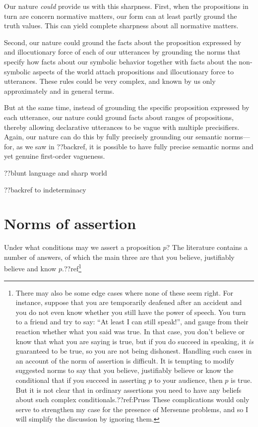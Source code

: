 Our nature \textit{could} provide us with this sharpness. First, when the propositions in turn are concern normative matters, our 
form can at least partly ground the truth values. This can yield complete sharpness about all normative matters.

Second, our nature could ground the facts about the proposition expressed by and illocutionary force of each of our utterances 
by grounding the norms that specify how facts about our symbolic behavior together with facts about the non-symbolic aspects of the world attach 
propositions and illocutionary force to utterances. These rules could be very complex, and known by us only approximately and in general
terms. 

But at the same time, instead of grounding the specific proposition expressed by each utterance, our nature could ground facts 
about ranges of propositions, thereby allowing declarative utterances to be vague with multiple precisifiers. Again, our nature 
can do this by fully precisely grounding our semantic norms---for, as we saw in ??backref, it is possible to have fully precise
semantic norms and yet genuine first-order vagueness.

??blunt language and sharp world


??backref to indeterminacy

\section{Norms of assertion}
Under what conditions may we assert a proposition $p$? The literature contains a number of answers, of which the main 
three are that you believe, justifiably believe and know $p$.??ref\footnote{There may also be some edge cases where none 
of these seem right. For instance, suppose that you are temporarily deafened after an accident and you do not even know whether 
you still have the power of speech. You turn to a friend and try to say: ``At least I can still speak!'', and gauge from 
their reaction whether what you said was true. In that case, you don't believe or know that what you are saying is true, but 
if you do succeed in speaking, it \textit{is} guaranteed to be true, so you are not being dishonest. Handling such cases in 
an account of the norm of assertion is difficult. It is tempting to modify suggested norms to say that you believe, 
justifiably believe or know the conditional that if you succeed in asserting $p$ to your audience, then $p$ is true. But it is 
not clear that in ordinary assertions you need to have any beliefs about such complex conditionals.??ref:Pruss These complications
would only serve to strengthen my case for the presence of Mersenne problems, and so I will simplify the discussion by ignoring them.}

